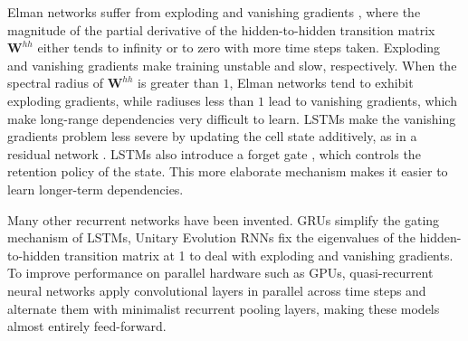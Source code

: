 \documentclass[12pt,a4paper,oneside]{book}
\newcommand{\vx}{\mathbf{x}}
\newcommand{\vc}{\mathbf{c}}
\newcommand{\vh}{\mathbf{h}}
\newcommand{\vb}{\mathbf{b}}
\newcommand{\vf}{\mathbf{f}}
\newcommand{\vi}{\mathbf{i}}
\newcommand{\vj}{\mathbf{j}}
\newcommand{\vo}{\mathbf{o}}
\newcommand{\mW}{\mathbf{W}}
\begin{document}
Elman networks suffer from exploding and vanishing gradients \citep{philipp2017exploding}, where the magnitude of the partial derivative of the hidden-to-hidden transition matrix $\mW^{hh}$ either tends to infinity or to zero with more time steps taken.
Exploding and vanishing gradients make training unstable and slow, respectively.
When the spectral radius of $\mW^{hh}$ is greater than $1$, Elman networks tend to exhibit exploding gradients, while radiuses less than $1$ lead to vanishing gradients, which make long-range dependencies very difficult to learn.
LSTMs \citep{hochreiter1997long} make the vanishing gradients problem less severe by updating the cell state additively, as in a residual network \citep{he2016deep}.
LSTMs also introduce a forget gate \citep{hochreiter1997lstm}, which controls the retention policy of the state.
This more elaborate mechanism makes it easier to learn longer-term dependencies.

Many other recurrent networks have been invented.
GRUs \citep{chung2015gated} simplify the gating mechanism of LSTMs, Unitary Evolution RNNs \citep{arjovsky2016unitary} fix the eigenvalues of the hidden-to-hidden transition matrix at 1 to deal with exploding and vanishing gradients.
To improve performance on parallel hardware such as GPUs, quasi-recurrent neural networks \citep{bradbury2016quasi} apply convolutional layers in parallel across time steps and alternate them with minimalist recurrent pooling layers, making these models almost entirely feed-forward.
\end{document}

